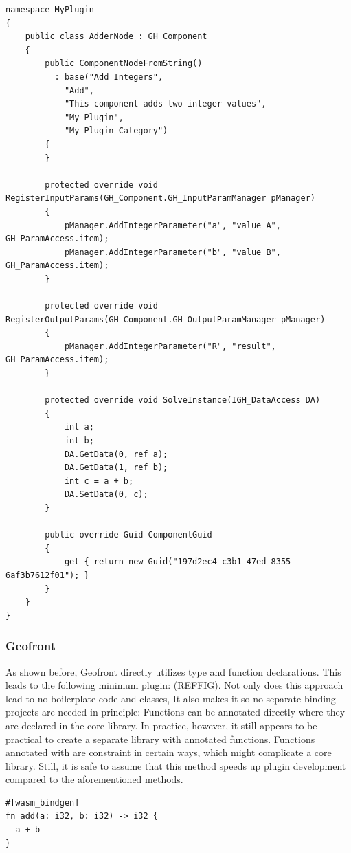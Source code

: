 \begin{lstlisting}
namespace MyPlugin
{
    public class AdderNode : GH_Component
    {
        public ComponentNodeFromString()
          : base("Add Integers",
            "Add",
            "This component adds two integer values",
            "My Plugin",
            "My Plugin Category")
        {
        }

        protected override void RegisterInputParams(GH_Component.GH_InputParamManager pManager)
        {
            pManager.AddIntegerParameter("a", "value A", GH_ParamAccess.item);
            pManager.AddIntegerParameter("b", "value B", GH_ParamAccess.item);
        }

        protected override void RegisterOutputParams(GH_Component.GH_OutputParamManager pManager)
        {
            pManager.AddIntegerParameter("R", "result", GH_ParamAccess.item);
        }

        protected override void SolveInstance(IGH_DataAccess DA)
        {
            int a;
            int b;
            DA.GetData(0, ref a);
            DA.GetData(1, ref b);
            int c = a + b;
            DA.SetData(0, c);
        }

        public override Guid ComponentGuid
        {
            get { return new Guid("197d2ec4-c3b1-47ed-8355-6af3b7612f01"); }
        }
    }
}
\end{lstlisting}



\subsubsection{Geofront}

As shown before, Geofront directly utilizes type and function declarations.
This leads to the following minimum plugin: (REFFIG).
Not only does this approach lead to no boilerplate code and classes, It also makes it so no separate binding projects are needed in principle: 
Functions can be annotated directly where they are declared in the core library. 
In practice, however, it still appears to be practical to create a separate library with annotated functions. 
Functions annotated with  are constraint in certain ways, which might complicate a core library.
Still, it is safe to assume that this method speeds up plugin development compared to the aforementioned methods.

\begin{lstlisting}
#[wasm_bindgen]
fn add(a: i32, b: i32) -> i32 {
  a + b
}
\end{lstlisting}


